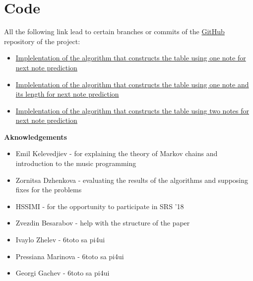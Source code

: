 \documentclass[]{article}
\begin{document}
    \section{Code}
        All the following link lead to certain branches or commits of the \href{https://github.com}{GitHub} repository of the project:
        \begin{itemize}
            \item \href{https://github.com/Ro6afF/compmus/tree/0cf9173a547a9effdc720dc6f6ac8ad551cd2fa4}{Implelentation of the algorithm that constructs the table using one note for next note prediction}
            \item \href{https://github.com/Ro6afF/compmus/tree/One_note_with_time}{Implelentation of the algorithm that constructs the table using one note and its length for next note prediction}
            \item \href{https://github.com/Ro6afF/compmus/tree/72fbc777ef7371ac7810d87d306ba3a2e8267121}{Implelentation of the algorithm that constructs the table using two notes for next note prediction}
        \end{itemize}
        \newpage
    {\large{\textbf{Aknowledgements}}}
    \begin{itemize}
        \item Emil Kelevedjiev - for explaining the theory of Markov chains and introduction to the music programming
        \item Zornitsa Dzhenkova - evaluating the results of the algorithms and supposing fixes for the problems
        \item HSSIMI - for the opportunity to participate in SRS '18
        \item Zvezdin Besarabov - help with the structure of the paper
        \item Ivaylo Zhelev - 6toto sa pi4ui
        \item Pressiana Marinova - 6toto sa pi4ui
        \item Georgi Gachev - 6toto sa pi4ui
    {}
    

    \end{itemize}
\end{document}
